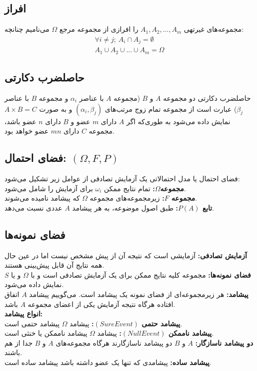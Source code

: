 \documentclass[12pt]{article}
\begin{document}
	\subsection*{افراز}
	مجموعه‌های غیرتهی $A_1,A_2,...,A_m$ را افرازی از مجموعه مرجع $\Omega$ می‌نامیم چنانچه: 
	\begin{align*}
		\forall i \neq j;\: A_i \cap A_j=\emptyset\\
		A_1 \cup A_2 \cup ...\cup A_m=\Omega
	\end{align*}	
	\subsection*{حاصلضرب دکارتی} 
	حاصلضرب دکارتی دو مجموعه $A$ و $B$ (مجموعه $A$ با عناصر $\alpha_i$ و مجموعه $B$ با عناصر $\beta_j$) عبارت است از مجموعه تمام زوج مرتب‌های $(\alpha_i,\beta_j)$ و به صورت $A\times B=C$ نمایش داده می‌شود به طوری‌که اگر $A$ دارای $m$ عضو و $B$ دارای $n$ عضو باشد، مجموعه $C$ دارای $mn$ عضو خواهد بود.
	
	\subsection*{فضای احتمال: $(\Omega,F,P)$}
	فضای احتمال یا مدل احتمالاتی یک آزمایش تصادفی از عوامل زیر تشکیل می‌شود:\\
	\textbf{مجموعه$\Omega$:}
	تمام نتایج ممکن $\omega_i$ برای آزمایش را شامل می‌شود.\\ 
	\textbf{مجموعه $F$:}
	زیرمجموعه‌های مجموعه $\Omega$ که پیشامد نامیده می‌شوند. \\
	\textbf{تابع $P(A)$:}
	طبق اصول موضوعه، به هر پیشامد $A$ عددی نسبت می‌دهد.
	
	\subsection*{فضای نمونه‌ها}
	\textbf{آزمایش تصادفی:}
	آزمایشی است که نتیجه آن از پیش مشخص نیست اما در عین حال همه نتایج آن قابل پیش‌بینی هستند. \\
	\textbf{فضای نمونه‌ها:}
	مجموعه کلیه نتایج ممکن برای یک آزمایش تصادفی است و با $\Omega$ و یا $S$ نمایش داده می‌شود.\\ 
	\textbf{پیشامد:}
	هر زیرمجموعه‌ای از فضای نمونه یک پیشامد است. می‌گوییم پیشامد $A$ اتفاق افتاده هرگاه نتیجه آزمایش یکی از اعضای مجموعه $A$ باشد.\\
	\textbf{انواع پیشامد:}\\
	\textbf{پیشامد حتمی $(Sure Event)$:}
	پیشامد $\Omega$ پیشامد حتمی است. \\
	\textbf{پیشامد ناممکن $(Null Event)$:}
	پیشامد $\Omega$ پیشامد ناممکن یا خنثی است. \\
	\textbf{دو پیشامد ناسازگار:}
	$A$ و $B$ دو پیشامد ناسازگارند هرگاه مجموعه‌های $A$ و $B$ جدا از هم باشند.
	\\ 
	\textbf{پیشامد ساده:}
	پیشامدی که تنها یک عضو داشته باشد پیشامد ساده است.
\end{document}
